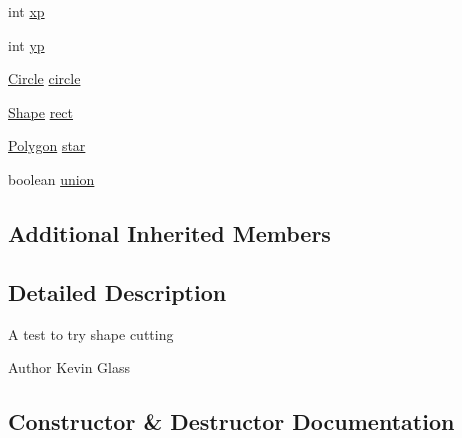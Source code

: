 \begin{DoxyCompactItemize}
\item 
int \mbox{\hyperlink{classorg_1_1newdawn_1_1slick_1_1tests_1_1_geom_util_test_a8130a979872cdb74e28a21b5402fae21}{xp}}
\item 
int \mbox{\hyperlink{classorg_1_1newdawn_1_1slick_1_1tests_1_1_geom_util_test_ab16aa08bab948180648dbf25d62810cf}{yp}}
\item 
\mbox{\hyperlink{classorg_1_1newdawn_1_1slick_1_1geom_1_1_circle}{Circle}} \mbox{\hyperlink{classorg_1_1newdawn_1_1slick_1_1tests_1_1_geom_util_test_a3c91b2f2a4fd18451ecf57387eb249d1}{circle}}
\item 
\mbox{\hyperlink{classorg_1_1newdawn_1_1slick_1_1geom_1_1_shape}{Shape}} \mbox{\hyperlink{classorg_1_1newdawn_1_1slick_1_1tests_1_1_geom_util_test_a729362c72d19eab6abb26bdf21be0445}{rect}}
\item 
\mbox{\hyperlink{classorg_1_1newdawn_1_1slick_1_1geom_1_1_polygon}{Polygon}} \mbox{\hyperlink{classorg_1_1newdawn_1_1slick_1_1tests_1_1_geom_util_test_a0e21f265f408eecbc08a4f47e2909f81}{star}}
\item 
boolean \mbox{\hyperlink{classorg_1_1newdawn_1_1slick_1_1tests_1_1_geom_util_test_a3f99a8c39aaa587b590914e8661a04c5}{union}}
\end{DoxyCompactItemize}
\subsection*{Additional Inherited Members}


\subsection{Detailed Description}
A test to try shape cutting

\begin{DoxyAuthor}{Author}
Kevin Glass 
\end{DoxyAuthor}


\subsection{Constructor \& Destructor Documentation}
\mbox{\label{classorg_1_1newdawn_1_1slick_1_1tests_1_1_geom_util_test_ad3f1f62610a3aa16ee201102e729b1e3}} 
